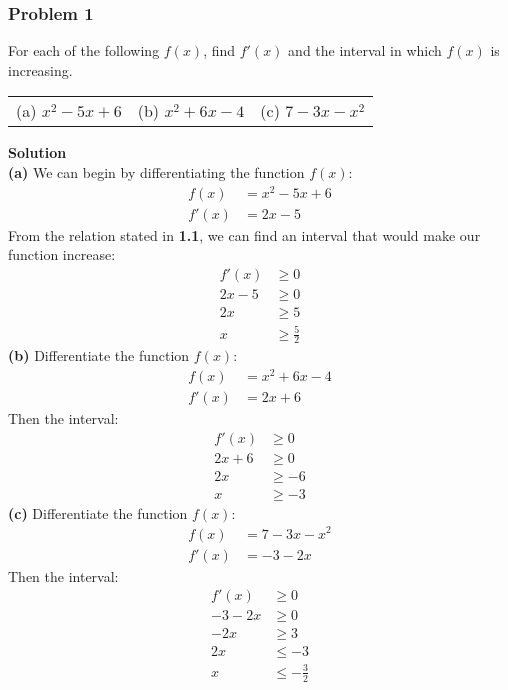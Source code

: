 \documentclass[hidelinks, a4paper, 12pt]{article}
\newcommand{\bd}{\textbf}
\newcommand{\n}{\\[\baselineskip]}
\begin{document}
            \subsubsection{Problem 1}
                For each of the following $f(x)$, find $f'(x)$ and the interval in which $f(x)$ is increasing.
                \begin{center}
                    \begin{tabularx}{\textwidth} {
                        X X X}
                        (a) $x^2-5x+6$ & (b) $x^2+6x-4$ & (c) $7-3x-x^2$ 
                    \end{tabularx}
                \end{center}
                \bd{Solution}\n
                \bd{(a)} We can begin by differentiating the function $f(x)$:
                \[\begin{split}
                    f(x) &= x^2 - 5x + 6\\
                    f'(x) &= 2x - 5
                \end{split}\]
                From the relation stated in \bd{1.1}, we can find an interval that would make our function increase:
                \[\begin{split}
                    f'(x) &\geq 0\\
                    2x-5 &\geq 0\\
                    2x &\geq 5\\
                    x &\geq \frac{5}{2}
                \end{split}\]
                \bd{(b)} Differentiate the function $f(x)$:
                \[\begin{split}
                    f(x) &= x^2 + 6x - 4\\
                    f'(x) &= 2x + 6
                \end{split}\]
                Then the interval:
                \[\begin{split}
                    f'(x) &\geq 0\\
                    2x+6 &\geq 0\\
                    2x &\geq -6\\
                    x &\geq -3
                \end{split}\]
                \bd{(c)} Differentiate the function $f(x)$:
                \[\begin{split}
                    f(x) &= 7 - 3x - x^2\\
                    f'(x) &= -3 - 2x
                \end{split}\]
                Then the interval:
                \[\begin{split}
                    f'(x) &\geq 0\\
                    -3 - 2x &\geq 0\\
                    -2x &\geq 3\\
                    2x &\leq -3\\
                    x &\leq -\frac{3}{2}
                \end{split}\]
            
\end{document}

